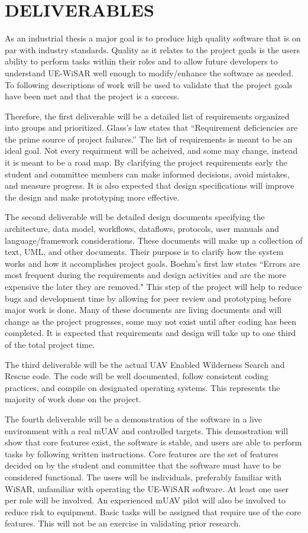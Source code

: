 \section{DELIVERABLES}
As an industrial thesis a major goal is to produce high quality software that is
on par with industry standards.  Quality as it relates to the project goals is
the users ability to perform tasks within their roles and to allow future
developers to understand UE-WiSAR well enough to modify/enhance the software as
needed.  To following descriptions of work will be used to validate that the
project goals have been met and that the project is a success.

Therefore, the first deliverable will be a detailed list of requirements
organized into groups and prioritized.  Glass's law states that ``Requirement deficiencies are the prime source of project failures.''  The list of requirements is meant to be an ideal goal.
Not every requirment will be acheived, and some may change, instead it is meant
to be a road map.  By clarifying the project requirements early the student and
committee members can make informed decisions, avoid mistakes, and measure progress.
It is also expected that design specifications will improve the design and make
prototyping more effective.  

The second deliverable will be detailed design documents specifying the
architecture, data model, workflows, dataflows, protocols, user manuals and
language/framework considerations.  These documents will make up a collection
of text, UML, and other documents.  Their purpose is to clarify how the system
works and how it accomplishes project goals.  Boehm's first law states ``Errors are most frequent during the requirements and design activities and are the
more expensive the later they are removed."  This step of the project will help
to reduce bugs and development time by allowing for peer review and prototyping
before major work is done.  Many of these documents are living documents and
will change as the project progresses, some may not exist until after coding
has been completed.  It is expected that requirements and design will take up to
one third of the total project time.

The third deliverable will be the actual UAV Enabled Wilderness Search and
Rescue code.  The code will be well documented, follow consistent coding
practices, and compile on designated operating systems.  This represents the
majority of work done on the project.

The fourth deliverable will be a demonstration of the software in a
live environment with a real mUAV and controlled targets.  This demostration
will show that core features exist, the software is stable, and users are able to perform tasks by following written
instructions.  Core features are the set of features decided on by the student
and committee that the software must have to be considered functional.  The
users will be individuals, preferably familiar with WiSAR, unfamiliar with
operating the UE-WiSAR software.  At least one user per role will be involved. 
An experienced mUAV pilot will also be involved to reduce risk to equipment. 
Basic tasks will be assigned that require use of the core features.  This will
not be an exercise in validating prior research.

